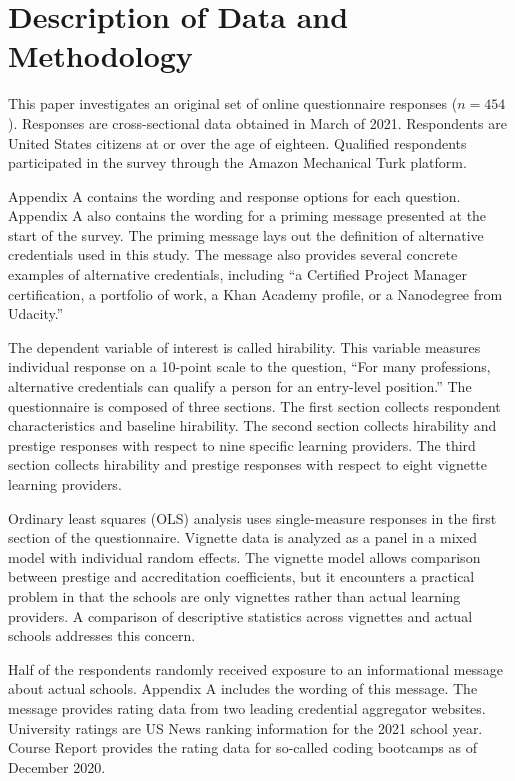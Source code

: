 \documentclass[review]{elsarticle}
\begin{document}
\section{Description of Data and Methodology}

This paper investigates an original set of online questionnaire responses ($n = 454$).
Responses are cross-sectional data obtained in March of 2021.
Respondents are United States citizens at or over the age of eighteen.
Qualified respondents participated in the survey through the Amazon Mechanical Turk platform.

Appendix A contains the wording and response options for each question.
Appendix A also contains the wording for a priming message presented at the start of the survey.
The priming message lays out the definition of alternative credentials used in this study.
The message also provides several concrete examples of alternative credentials,
including ``a Certified Project Manager certification,
a portfolio of work, a Khan Academy profile, or a Nanodegree from Udacity.''

The dependent variable of interest is called hirability.
This variable measures individual response on a 10-point scale to the question,
``For many professions, alternative credentials can qualify a person for an entry-level position.''
The questionnaire is composed of three sections.
The first section collects respondent characteristics and baseline hirability.
The second section collects hirability and prestige responses with respect to nine specific learning providers.
The third section collects hirability and prestige responses with respect to eight vignette learning providers.

Ordinary least squares (OLS) analysis uses single-measure responses in the first section of the questionnaire.
Vignette data is analyzed as a panel in a mixed model with individual random effects.
The vignette model allows comparison between prestige and accreditation coefficients,
but it encounters a practical problem in that the schools are only vignettes rather than actual learning providers.
A comparison of descriptive statistics across vignettes and actual schools addresses this concern.

Half of the respondents randomly received exposure to an informational message about actual schools.
Appendix A includes the wording of this message.
The message provides rating data from two leading credential aggregator websites.
University ratings are US News ranking information for the 2021 school year.
Course Report provides the rating data for so-called coding bootcamps as of December 2020.
\end{document}

